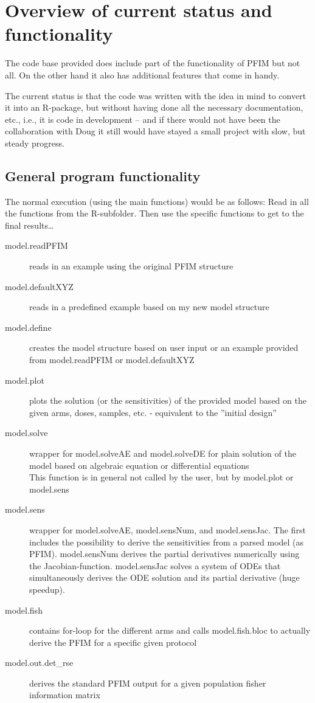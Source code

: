 \section{Overview of current status and functionality}
The code base provided does include part of the functionality of PFIM but not all.
On the other hand it also has additional features that come in handy.

The current status is that the code was written with the idea in mind to convert it into an R-package, but without having done all the necessary documentation, etc., i.e., it is code in development -- and if there would not have been the collaboration with Doug it still would have stayed a small project with slow, but steady progress.

\subsection{General program functionality}
The normal execution (using the main functions) would be as follows:
Read in all the functions from the R-subfolder.
Then use the specific functions to get to the final results\dots

\begin{description}
\item[model.readPFIM] reads in an example using the original PFIM structure
\item[model.defaultXYZ] reads in a predefined example based on my new model structure
\item[model.define] creates the model structure based on user input or an example provided from model.readPFIM or model.defaultXYZ
\item[model.plot] plots the solution (or the sensitivities) of the provided model based on the given arms, doses, samples, etc. - equivalent to the ''initial design''
\item[model.solve] wrapper for model.solveAE and model.solveDE for plain solution of the model based on algebraic equation or differential equations\\
This function is in general not called by the user, but by model.plot or model.sens
\item[model.sens] wrapper for model.solveAE, model.sensNum, and model.sensJac. The first includes the possibility to derive the sensitivities from a parsed model (as PFIM). model.sensNum derives the partial derivatives numerically using the Jacobian-function. model.sensJac solves a system of ODEs that simultaneously derives the ODE solution and its partial derivative (huge speedup).
\item[model.fish] contains for-loop for the different arms and calls model.fish.bloc to actually derive the PFIM for a specific given protocol
\item[model.out.det\_rse] derives the standard PFIM output for a given population fisher information matrix
\end{description}

